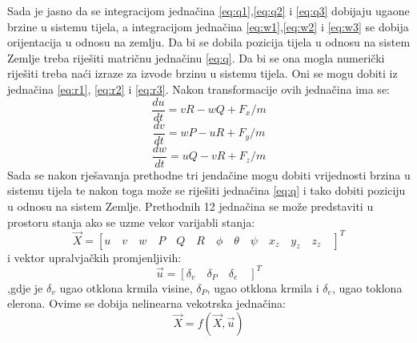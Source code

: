 Sada je jasno da se integracijom jednačina \ref{eq:q1},\ref{eq:q2} i \ref{eq:q3} dobijaju 
ugaone brzine u sistemu tijela, a integracijom jednačina \ref{eq:w1},\ref{eq:w2} i \ref{eq:w3}  se dobija 
orijentacija u odnosu na zemlju. Da bi se dobila pozicija tijela u odnosu na sistem Zemlje
treba riješiti matričnu jednačinu \ref{eq:q}. Da bi se ona mogla numerički riješiti treba 
naći izraze za izvode brzinu u sistemu tijela. Oni se mogu dobiti iz jednačina 
\ref{eq:r1}, \ref{eq:r2} i \ref{eq:r3}. Nakon transformacije ovih jednačina ima se:
\begin{equation}
    \frac{du}{dt}=vR-wQ+F_x/m
\end{equation}
\begin{equation}
    \frac{dv}{dt}=wP-uR+F_y/m
\end{equation}
\begin{equation}
    \frac{dw}{dt}=uQ-vR+F_z/m
\end{equation}
Sada se nakon rješavanja prethodne tri jendačine mogu dobiti vrijednosti brzina u sistemu tijela 
te nakon toga može se riješiti jednačina \ref{eq:q} i tako dobiti poziciju u odnosu na sistem Zemlje.
Prethodnih 12 jednačina se može predstaviti u prostoru stanja ako se uzme vekor varijabli stanja:
\[\vec{X}=\left[ u \quad v\quad w\quad P\quad Q\quad R\quad \phi \quad \theta \quad
 \psi \quad x_z\quad y_z\quad z_z\quad \right]^T\] i vektor upralvjačkih 
promjenljivih:
\[\vec{u}=\left[\delta_v \quad \delta_P\quad \delta_e\quad \right]^T\] 
,gdje je $\delta_v$ ugao otklona krmila visine, $\delta_P$, ugao otklona krmila 
 i $\delta_e$, ugao toklona elerona. Ovime se dobija nelinearna vekotrska jednačina:
\begin{equation}
    \vec{X}=f(\vec{X},\vec{u})
\end{equation}


